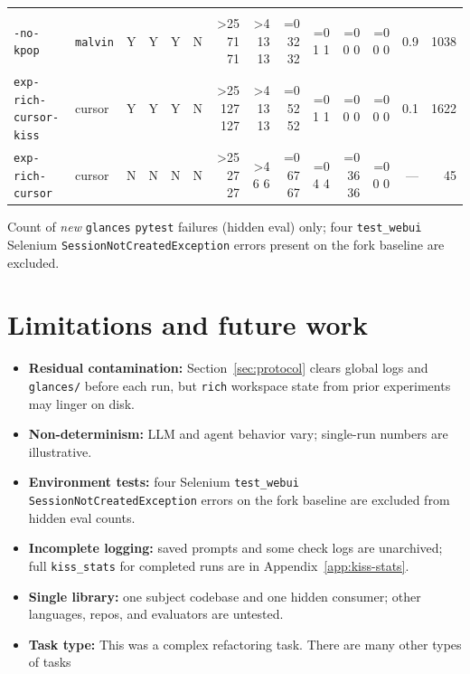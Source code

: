 \documentclass[11pt]{article}
\newcommand{\outcellle}[2]{%
  \ifnum#1>#2\relax
    \cellcolor{failbg}#1%
  \else
    \cellcolor{passbg}#1%
  \fi}
\newcommand{\outcelleq}[2]{%
  \ifnum#1=#2\relax
    \cellcolor{passbg}#1%
  \else
    \cellcolor{failbg}#1%
  \fi}
\newcommand{\missdata}{---}
\newcommand{\yes}{Y}
\newcommand{\no}{N}
\newcommand{\exptidy}[1]{\makecell[l]{\texttt{exp-rich-tidy}\\[1pt]\hspace{0.75em}\texttt{#1}}}
\begin{document}
\begin{table}[ht]
\begin{threeparttable}
\begin{tabular}{@{}l l c c c c | r r r r r r r r@{}}
    \exptidy{-no-kpop} &
    \texttt{malvin} & \yes & \yes & \yes & \no &
    \outcellle{71}{25} & \outcellle{13}{4} & \outcelleq{32}{0} & \outcelleq{1}{0} & \outcelleq{0}{0} & \outcelleq{0}{0} & 0.9 & 1038 \\
    \texttt{exp-rich-cursor-kiss} &
    cursor & \yes & \yes & \yes & \no &
    \outcellle{127}{25} & \outcellle{13}{4} & \outcelleq{52}{0} & \outcelleq{1}{0} & \outcelleq{0}{0} & \outcelleq{0}{0} & 0.1 & 1622 \\
    \texttt{exp-rich-cursor} &
    cursor & \no & \no & \no & \no &
    \outcellle{27}{25} & \outcellle{6}{4} & \outcelleq{67}{0} & \outcelleq{4}{0} & \outcelleq{36}{0} & \outcelleq{0}{0} & \missdata & 45 \\
    \bottomrule
  \end{tabular}
  \begin{tablenotes}
    \small
    \item[$^\dagger$] Count of \emph{new} \texttt{glances} \texttt{pytest} failures (hidden eval) only; four \texttt{test\_webui} Selenium \texttt{SessionNotCreatedException} errors present on the fork baseline are excluded.
  \end{tablenotes}
  \end{threeparttable}
\end{table}


\section{Limitations and future work}
\label{sec:limitations}

\begin{itemize}[nosep]
  \item \textbf{Residual contamination:} Section~\ref{sec:protocol} clears global logs and \texttt{glances/} before each run, but \texttt{rich} workspace state from prior experiments may linger on disk.
  \item \textbf{Non-determinism:} LLM and agent behavior vary; single-run numbers are illustrative.
  \item \textbf{Environment tests:} four Selenium \texttt{test\_webui} \texttt{SessionNotCreatedException} errors on the fork baseline are excluded from hidden eval counts.
  \item \textbf{Incomplete logging:} saved prompts and some check logs are unarchived; full \texttt{kiss\_stats} for completed runs are in Appendix~\ref{app:kiss-stats}.
  \item \textbf{Single library:} one subject codebase and one hidden consumer; other languages, repos, and evaluators are untested.
  \item \textbf{Task type:} This was a complex refactoring task. There are many other types of tasks
\end{itemize}
\end{document}
